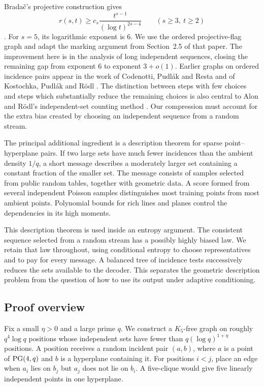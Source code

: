 Brada\v{c}'s projective construction gives
\[
 r(s,t)\ge c_s\frac{t^{s-1}}{(\log t)^{2s-4}}
 \qquad(s\ge3,\ t\ge2)
\]
\cite[Theorem~1.1]{Bradac2026}.
For \(s=5\), its logarithmic exponent is \(6\).
We use the ordered projective-flag graph and adapt the marking
argument from Section~2.5 of that paper. The improvement here is in
the analysis of long independent sequences, closing the remaining
gap from exponent \(6\) to exponent \(3+o(1)\).
Earlier graphs on ordered incidence pairs appear in the work of
Codenotti, Pudl\'ak and Resta and of Kostochka, Pudl\'ak and R\"odl
\cite{CodenottiPudlakResta2000,KostochkaPudlakRodl2010}.
The distinction between steps with few choices and steps which
substantially reduce the remaining choices is also central to
Alon and R\"odl's independent-set counting method
\cite{AlonRodl2005}.  Our compression must account for the extra bias
created by choosing an independent sequence from a random stream.

The principal additional ingredient is a description theorem for
sparse point--hyperplane pairs. If two large sets have much fewer
incidences than the ambient density \(1/q\), a short message describes
a moderately larger set containing a constant fraction of the smaller
set. The message consists of samples selected from public random
tables, together with geometric data. A score formed from several
independent Poisson samples distinguishes most training points from
most ambient points. Polynomial bounds for rich lines and planes
control the dependencies in its high moments.

This description theorem is used inside an entropy argument.
The consistent sequence selected from a random stream has a
possibly highly biased law. We retain that law throughout, using
conditional entropy to choose representatives and to pay for every
message. A balanced tree of incidence tests successively reduces the
sets available to the decoder. This separates the geometric
description problem from the question of how to use its output
under adaptive conditioning.

\subsection{Proof overview}

Fix a small \(\eta>0\) and a large prime \(q\). We construct a
\(K_5\)-free graph on roughly \(q^4\log q\) positions whose independent
sets have fewer than \(q(\log q)^{1+\eta}\) positions.
A position receives a random incident pair \((a,b)\), where \(a\)
is a point of \(\operatorname{PG}(4,q)\) and \(b\) is a hyperplane containing it.
For positions \(i<j\), place an edge when \(a_i\) lies on \(b_j\)
but \(a_j\) does not lie on \(b_i\). A five-clique would give five
linearly independent points in one hyperplane.

